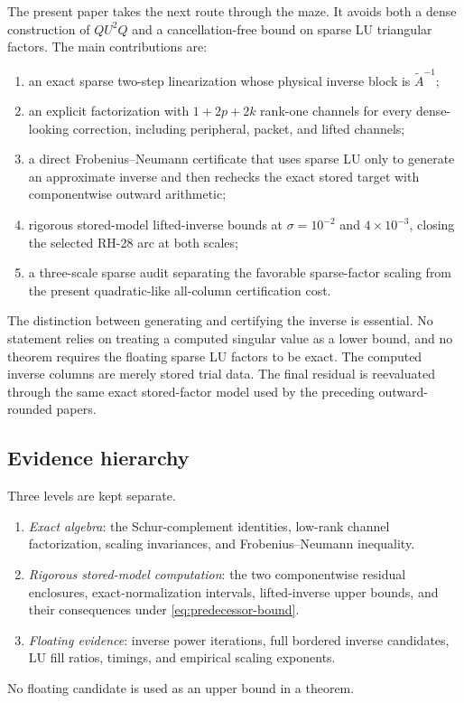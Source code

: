 \documentclass[11pt]{article}
\theoremstyle{definition}
\theoremstyle{remark}
\newcommand{\Atilde}{\widetilde A}
\begin{document}
The present paper takes the next route through the maze.  It avoids both a
dense construction of $QU^2Q$ and a cancellation-free bound on sparse LU
triangular factors.  The main contributions are:
\begin{enumerate}
 \item an exact sparse two-step linearization whose physical inverse block is
       $\Atilde^{-1}$;
 \item an explicit factorization with $1+2p+2k$ rank-one channels for every dense-looking
       correction, including peripheral, packet, and lifted channels;
 \item a direct Frobenius--Neumann certificate that uses sparse LU only to
       generate an approximate inverse and then rechecks the exact stored
       target with componentwise outward arithmetic;
 \item rigorous stored-model lifted-inverse bounds at
       $\sigma=10^{-2}$ and $4\times10^{-3}$, closing the selected RH-28 arc
       at both scales;
 \item a three-scale sparse audit separating the favorable sparse-factor
       scaling from the present quadratic-like all-column certification
       cost.
\end{enumerate}

The distinction between generating and certifying the inverse is essential.
No statement relies on treating a computed singular value as a lower bound,
and no theorem requires the floating sparse LU factors to be exact.  The
computed inverse columns are merely stored trial data.  The final residual is
reevaluated through the same exact stored-factor model used by the preceding
outward-rounded papers.

\subsection{Evidence hierarchy}

Three levels are kept separate.
\begin{enumerate}
 \item \emph{Exact algebra}: the Schur-complement identities, low-rank
       channel factorization, scaling invariances, and
       Frobenius--Neumann inequality.
 \item \emph{Rigorous stored-model computation}: the two componentwise
       residual enclosures, exact-normalization intervals, lifted-inverse
       upper bounds, and their consequences under
       \cref{eq:predecessor-bound}.
 \item \emph{Floating evidence}: inverse power iterations, full bordered
       inverse candidates, LU fill ratios, timings, and empirical scaling
       exponents.
\end{enumerate}
No floating candidate is used as an upper bound in a theorem.
\end{document}
